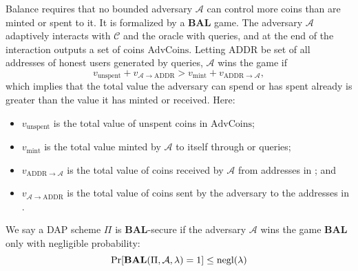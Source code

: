 \documentclass{llncs}
\begin{document}
Balance requires that no bounded adversary $\mathcal{A}$ can control more coins than are minted or spent to it.
It is formalized by a \textbf{BAL} game.
The adversary $\mathcal{A}$ adaptively interacts with $\mathcal{C}$ and the oracle with queries, and at the end of the interaction outputs a set of coins $\text{AdvCoins}$.
Letting $\text{ADDR}$ be set of all addresses of honest users generated by  queries, $\mathcal{A}$ wins the game if
$$v_{\text{unspent}} + v_{\mathcal{A} \to \text{ADDR}} > v_{\text{mint}} + v_{\text{ADDR} \to \mathcal{A}},$$
which implies that the total value the adversary can spend or has spent already is greater than the value it has minted or received.
Here:
\begin{itemize}
    \item $v_{\text{unspent}}$ is the total value of unspent coins in $\text{AdvCoins}$;
    \item $v_{\text{mint}}$ is the total value minted by $\mathcal{A}$ to itself through  or  queries;
    \item $v_{\text{ADDR} \xrightarrow{} \mathcal{A}}$ is the total value of coins received by $\mathcal{A}$ from addresses in ; and
    \item $v_{\mathcal{A} \xrightarrow{} \text{ADDR}}$ is the total value of coins sent by the adversary to the addresses in .
\end{itemize}
We say a DAP scheme $\Pi$ is \textbf{BAL}-secure if the adversary $\mathcal{A}$ wins the game \textbf{BAL} only with negligible probability:
$$\text{Pr}[\text{\textbf{BAL}}(\Pi, \mathcal{A}, \lambda) = 1] \leq \text{negl}(\lambda)$$
\end{document}
